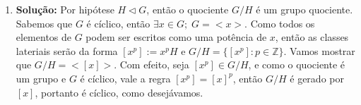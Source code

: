 \documentclass{article}
\begin{document}
\begin{enumerate}
		\item \textbf{Solução:} Por hipótese $H \vartriangleleft G$, então o quociente $G/H$ é um grupo quociente. Sabemos que $G$ é cíclico, então $\exists x \in G; \; G=<x>$. Como todos os elementos de $G$ podem ser escritos como uma potência de $x$, então as classes lateriais serão da forma $[x^{p}]:=x^{p}H$ e $G/H = \{[x^{p}]: p\in \mathbb{Z}\}$. Vamos mostrar que $G/H = <[x]>$. Com efeito, seja $[x^{p}] \in G/H$, e como o quociente é um grupo e $G$ é cíclico, vale a regra $[x^{p}] = [x]^{p}$, então $G/H$ é gerado por $[x]$, portanto é cíclico, como desejávamos.
		
\end{enumerate}
		
\end{document}
